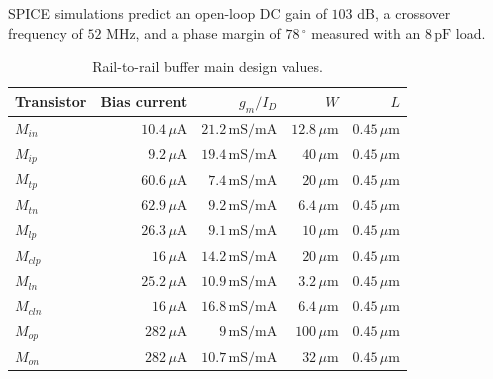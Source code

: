 SPICE simulations predict an open-loop DC gain of $103$ dB, a crossover frequency of $52$ MHz, and a phase margin of $78\,^\circ$ measured with an $8\,\text{pF}$ load. 
\begin{table}[!t]
	\begin{center}
		\begin{tabular}{|l|r|r|r|r|}\hline
			Transistor & Bias current & $g_m/I_D$ & $W$ & $L$ \\ \hline\hline
			$M_\textit{in}$ & $10.4\,\mu\text{A}$ & $21.2\,\text{mS}/\text{mA}$ & $12.8\,\mu\text{m}$ & $0.45\,\mu\text{m}$ \\ \hline
			$M_\textit{ip}$ & $9.2\,\mu\text{A}$ & $19.4\,\text{mS}/\text{mA}$ & $40\,\mu\text{m}$ & $0.45\,\mu\text{m}$ \\ \hline
			$M_\textit{tp}$ & $60.6\,\mu\text{A}$ & $7.4\,\text{mS}/\text{mA}$ & $20\,\mu\text{m}$ & $0.45\,\mu\text{m}$ \\ \hline
			$M_\textit{tn}$ & $62.9\,\mu\text{A}$ & $9.2\,\text{mS}/\text{mA}$ & $6.4\,\mu\text{m}$ & $0.45\,\mu\text{m}$ \\ \hline
			$M_\textit{lp}$ & $26.3\,\mu\text{A}$ & $9.1\,\text{mS}/\text{mA}$ & $10\,\mu\text{m}$ & $0.45\,\mu\text{m}$ \\ \hline
			$M_\textit{clp}$ & $16\,\mu\text{A}$ & $14.2\,\text{mS}/\text{mA}$ & $20\,\mu\text{m}$ & $0.45\,\mu\text{m}$ \\ \hline
			$M_\textit{ln}$ & $25.2\,\mu\text{A}$ & $10.9\,\text{mS}/\text{mA}$ & $3.2\,\mu\text{m}$ & $0.45\,\mu\text{m}$ \\ \hline
			$M_\textit{cln}$ & $16\,\mu\text{A}$ & $16.8\,\text{mS}/\text{mA}$ & $6.4\,\mu\text{m}$ & $0.45\,\mu\text{m}$ \\ \hline
			$M_\textit{op}$ & $282\,\mu\text{A}$ & $9\,\text{mS}/\text{mA}$ & $100\,\mu\text{m}$ & $0.45\,\mu\text{m}$ \\ \hline
			$M_\textit{on}$ & $282\,\mu\text{A}$ & $10.7\,\text{mS}/\text{mA}$ & $32\,\mu\text{m}$ & $0.45\,\mu\text{m}$ \\\hline
		\end{tabular}
		\vspace*{5pt}
		\caption{Rail-to-rail buffer main design values.}
		\label{tab:buffer_sizes}
	\end{center}
\end{table}

